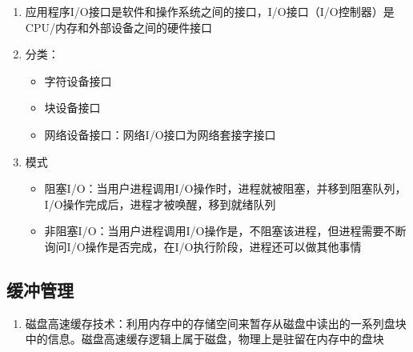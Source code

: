 \documentclass[./computer-organization-and-architecture.tex]{subfiles}
\begin{document}
    \begin{enumerate}
        \item 应用程序I/O接口是软件和操作系统之间的接口，I/O接口（I/O控制器）是CPU/内存和外部设备之间的硬件接口
        \item 分类：
        \begin{itemize}
            \item 字符设备接口
            \item 块设备接口
            \item 网络设备接口：网络I/O接口为网络套接字接口
        \end{itemize}
        \item 模式
        \begin{itemize}
            \item 阻塞I/O：当用户进程调用I/O操作时，进程就被阻塞，并移到阻塞队列，I/O操作完成后，进程才被唤醒，移到就绪队列
            \item 非阻塞I/O：当用户进程调用I/O操作是，不阻塞该进程，但进程需要不断询问I/O操作是否完成，在I/O执行阶段，进程还可以做其他事情
        \end{itemize}
    \end{enumerate}

    \subsection{缓冲管理}

    \begin{enumerate}
        \item 磁盘高速缓存技术：利用内存中的存储空间来暂存从磁盘中读出的一系列盘块中的信息。磁盘高速缓存逻辑上属于磁盘，物理上是驻留在内存中的盘块
    \end{enumerate}
\end{document}
